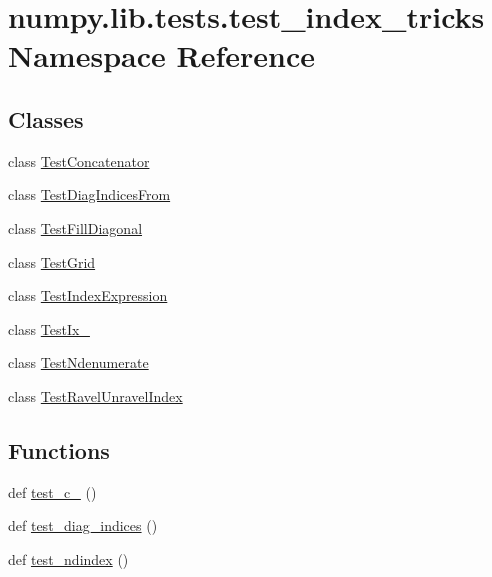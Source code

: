 \hypertarget{namespacenumpy_1_1lib_1_1tests_1_1test__index__tricks}{}\section{numpy.\+lib.\+tests.\+test\+\_\+index\+\_\+tricks Namespace Reference}
\label{namespacenumpy_1_1lib_1_1tests_1_1test__index__tricks}
\subsection*{Classes}
\begin{DoxyCompactItemize}
\item 
class \hyperlink{classnumpy_1_1lib_1_1tests_1_1test__index__tricks_1_1TestConcatenator}{Test\+Concatenator}
\item 
class \hyperlink{classnumpy_1_1lib_1_1tests_1_1test__index__tricks_1_1TestDiagIndicesFrom}{Test\+Diag\+Indices\+From}
\item 
class \hyperlink{classnumpy_1_1lib_1_1tests_1_1test__index__tricks_1_1TestFillDiagonal}{Test\+Fill\+Diagonal}
\item 
class \hyperlink{classnumpy_1_1lib_1_1tests_1_1test__index__tricks_1_1TestGrid}{Test\+Grid}
\item 
class \hyperlink{classnumpy_1_1lib_1_1tests_1_1test__index__tricks_1_1TestIndexExpression}{Test\+Index\+Expression}
\item 
class \hyperlink{classnumpy_1_1lib_1_1tests_1_1test__index__tricks_1_1TestIx__}{Test\+Ix\+\_\+}
\item 
class \hyperlink{classnumpy_1_1lib_1_1tests_1_1test__index__tricks_1_1TestNdenumerate}{Test\+Ndenumerate}
\item 
class \hyperlink{classnumpy_1_1lib_1_1tests_1_1test__index__tricks_1_1TestRavelUnravelIndex}{Test\+Ravel\+Unravel\+Index}
\end{DoxyCompactItemize}
\subsection*{Functions}
\begin{DoxyCompactItemize}
\item 
def \hyperlink{namespacenumpy_1_1lib_1_1tests_1_1test__index__tricks_a5f44c13abce5896a890473b9420ee3f8}{test\+\_\+c\+\_\+} ()
\item 
def \hyperlink{namespacenumpy_1_1lib_1_1tests_1_1test__index__tricks_a703e2840e4fec9d62e815fff47e8dba8}{test\+\_\+diag\+\_\+indices} ()
\item 
def \hyperlink{namespacenumpy_1_1lib_1_1tests_1_1test__index__tricks_ae733ec6a11beced1396d1e812d60a8eb}{test\+\_\+ndindex} ()
\end{DoxyCompactItemize}


